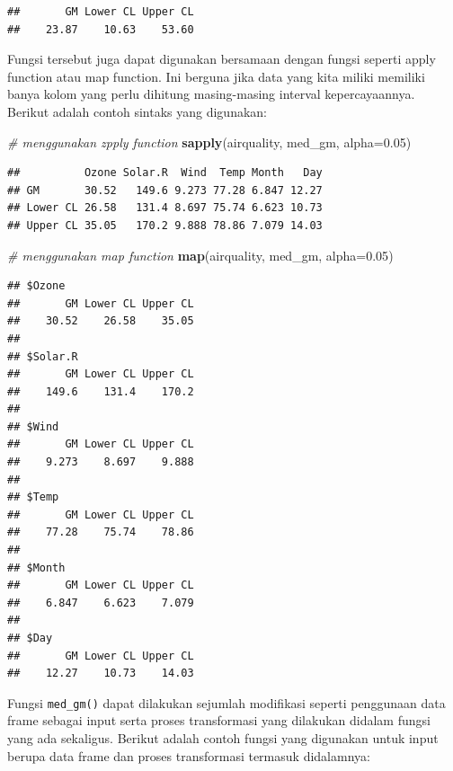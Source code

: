 \documentclass[]{book}
\newenvironment{Shaded}{\begin{snugshade}}{\end{snugshade}}
\newcommand{\KeywordTok}[1]{\textcolor[rgb]{0.13,0.29,0.53}{\textbf{#1}}}
\newcommand{\DataTypeTok}[1]{\textcolor[rgb]{0.13,0.29,0.53}{#1}}
\newcommand{\FloatTok}[1]{\textcolor[rgb]{0.00,0.00,0.81}{#1}}
\newcommand{\CommentTok}[1]{\textcolor[rgb]{0.56,0.35,0.01}{\textit{#1}}}
\newcommand{\NormalTok}[1]{#1}
\begin{document}
\begin{verbatim}
##       GM Lower CL Upper CL 
##    23.87    10.63    53.60
\end{verbatim}

Fungsi tersebut juga dapat digunakan bersamaan dengan fungsi seperti
apply function atau map function. Ini berguna jika data yang kita miliki
memiliki banya kolom yang perlu dihitung masing-masing interval
kepercayaannya. Berikut adalah contoh sintaks yang digunakan:

\begin{Shaded}
\begin{Highlighting}[]
\CommentTok{# menggunakan zpply function}
\KeywordTok{sapply}\NormalTok{(airquality, med_gm, }\DataTypeTok{alpha=}\FloatTok{0.05}\NormalTok{)}
\end{Highlighting}
\end{Shaded}

\begin{verbatim}
##          Ozone Solar.R  Wind  Temp Month   Day
## GM       30.52   149.6 9.273 77.28 6.847 12.27
## Lower CL 26.58   131.4 8.697 75.74 6.623 10.73
## Upper CL 35.05   170.2 9.888 78.86 7.079 14.03
\end{verbatim}

\begin{Shaded}
\begin{Highlighting}[]
\CommentTok{# menggunakan map function}
\KeywordTok{map}\NormalTok{(airquality, med_gm, }\DataTypeTok{alpha=}\FloatTok{0.05}\NormalTok{)}
\end{Highlighting}
\end{Shaded}

\begin{verbatim}
## $Ozone
##       GM Lower CL Upper CL 
##    30.52    26.58    35.05 
## 
## $Solar.R
##       GM Lower CL Upper CL 
##    149.6    131.4    170.2 
## 
## $Wind
##       GM Lower CL Upper CL 
##    9.273    8.697    9.888 
## 
## $Temp
##       GM Lower CL Upper CL 
##    77.28    75.74    78.86 
## 
## $Month
##       GM Lower CL Upper CL 
##    6.847    6.623    7.079 
## 
## $Day
##       GM Lower CL Upper CL 
##    12.27    10.73    14.03
\end{verbatim}

Fungsi \texttt{med\_gm()} dapat dilakukan sejumlah modifikasi seperti
penggunaan data frame sebagai input serta proses transformasi yang
dilakukan didalam fungsi yang ada sekaligus. Berikut adalah contoh
fungsi yang digunakan untuk input berupa data frame dan proses
transformasi termasuk didalamnya:
\end{document}
